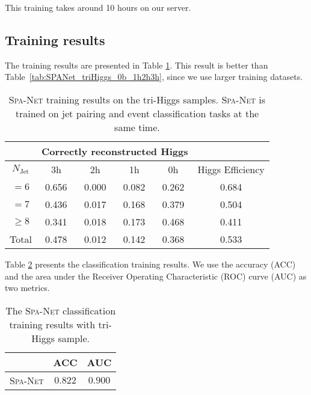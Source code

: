 \documentclass[12pt]{article}
\begin{document}
		This training takes around 10 hours on our server.
	\subsection{Training results}%
	\label{sub:training_results}
		The training results are presented in Table \ref{tab:SPANet_triHiggs_0b_cls_pairing_results}. This result is better than Table~\ref{tab:SPANet_triHiggs_0b_1h2h3h}, since we use larger training datasets.

		\begin{table}[htpb]
			\centering
			\caption{\textsc{Spa-Net} training results on the tri-Higgs samples. \textsc{Spa-Net} is trained on jet pairing and event classification tasks at the same time.}
			\label{tab:SPANet_triHiggs_0b_cls_pairing_results}
			\begin{tabular}{c|cccc|c}
			\multicolumn{1}{l|}{} & \multicolumn{4}{c|}{Correctly reconstructed Higgs} & \multicolumn{1}{l}{} \\ \hline
			$N_\text{Jet}$        & 3h          & 2h         & 1h         & 0h         & Higgs Efficiency     \\ \hline
			$=6$                  & 0.656       & 0.000      & 0.082      & 0.262      & 0.684                \\
			$=7$                  & 0.436       & 0.017      & 0.168      & 0.379      & 0.504                \\
			$\ge 8$               & 0.341       & 0.018      & 0.173      & 0.468      & 0.411                \\ \hline
			Total                 & 0.478       & 0.012      & 0.142      & 0.368      & 0.533               
			\end{tabular}
			
		\end{table}

		Table \ref{tab:SPANet_triHiggs_0b_cls_classification_results} presents the classification training results. We use the accuracy (ACC) and the area under the Receiver Operating Characteristic (ROC) curve (AUC) as two metrics.
		\begin{table}[htpb]
			\centering
			\caption{The \textsc{Spa-Net} classification training results with tri-Higgs sample.}
			\label{tab:SPANet_triHiggs_0b_cls_classification_results}
			\begin{tabular}{c|cc}
				             & ACC     & AUC      \\ \hline
			\textsc{Spa-Net} & $0.822$ & $0.900 $
			\end{tabular}
		\end{table}


		
\end{document}
